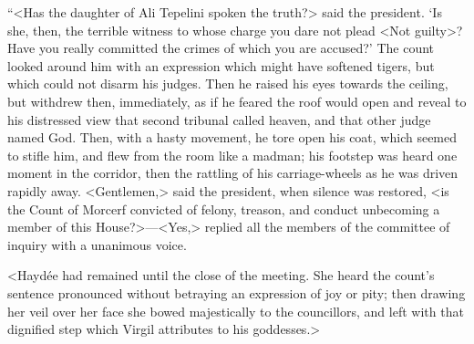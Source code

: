  “<Has the daughter of Ali Tepelini spoken the truth?> said the president. ‘Is she, then, the terrible witness to whose charge you dare not plead <Not guilty>? Have you really committed the crimes of which you are accused?' The count looked around him with an expression which might have softened tigers, but which could not disarm his judges. Then he raised his eyes towards the ceiling, but withdrew then, immediately, as if he feared the roof would open and reveal to his distressed view that second tribunal called heaven, and that other judge named God. Then, with a hasty movement, he tore open his coat, which seemed to stifle him, and flew from the room like a madman; his footstep was heard one moment in the corridor, then the rattling of his carriage-wheels as he was driven rapidly away. <Gentlemen,> said the president, when silence was restored, <is the Count of Morcerf convicted of felony, treason, and conduct unbecoming a member of this House?>—<Yes,> replied all the members of the committee of inquiry with a unanimous voice. 

 <Haydée had remained until the close of the meeting. She heard the count's sentence pronounced without betraying an expression of joy or pity; then drawing her veil over her face she bowed majestically to the councillors, and left with that dignified step which Virgil attributes to his goddesses.> 